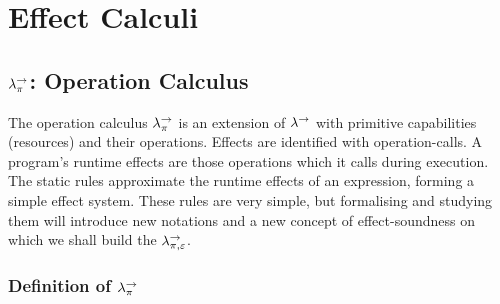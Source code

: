 \chapter{Effect Calculi}

\section{$\lambda^{\rightarrow}_{\pi}$: Operation Calculus}

The operation calculus $\lambda^{\rightarrow}_{\pi}$ is an extension of $\lambda^{\rightarrow}$ with primitive capabilities (resources) and their operations. Effects are identified with operation-calls. A program's runtime effects are those operations which it calls during execution. The static rules approximate the runtime effects of an expression, forming a simple effect system. These rules are very simple, but formalising and studying them will introduce new notations and a new concept of effect-soundness on which we shall build the $\lambda^{\rightarrow}_{\pi, \varepsilon}$.

\subsection{Definition of $\lambda^{\rightarrow}_{\pi}$}

